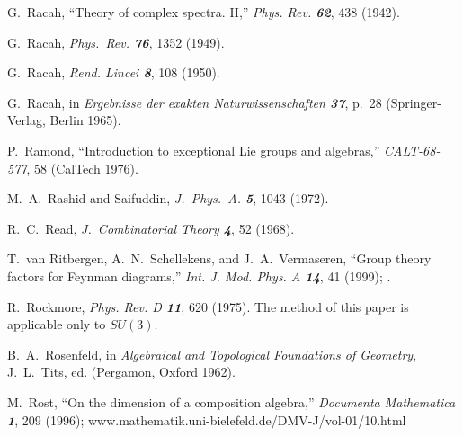 
 G.~Racah,
``Theory of complex spectra. II,''
{\em Phys. Rev.   \bf 62}, 438 (1942).

 G.~Racah,
{\em Phys.~Rev.  \bf 76}, 1352 (1949).

 G.~Racah,
{\em Rend. Lincei   \bf 8}, 108 (1950).

 G.~Racah, in
{\em Ergebnisse der exakten Naturwissenschaften \bf 37},
 p.~28 (Springer-Verlag, Berlin 1965). %


P.~Ramond,
``Introduction to exceptional Lie groups and algebras,''
{\em CALT-68-577}, 58 (CalTech 1976).

M.~A.~Rashid and Saifuddin,
{\em J.~Phys.~A.  \bf 5}, 1043 (1972).

R.~C.~Read,
{\em J.~Combinatorial Theory  \bf 4}, 52 (1968).

T.~van Ritbergen, A.~N.~Schellekens, and J.~A.~Vermaseren,
``Group theory factors for Feynman diagrams,''
{\em Int.  J.  Mod.  Phys.    A \bf 14}, 41 (1999);
.


 R.~Rockmore,
    {\em Phys. Rev. D  \bf 11}, 620 (1975).
    The method of this paper is applicable only to $SU(3)$.


 B.~A.~Rosenfeld,
in {\em Algebraical and Topological Foundations of Geometry},  J.~L.~Tits, ed.
    (Pergamon, Oxford 1962).

 M.~Rost,
    ``On the dimension of a composition algebra,''
    {\em Documenta Mathematica \bf 1}, 209 (1996); %
     {www.mathematik.uni-bielefeld.de/DMV-J/vol-01/10.html}

